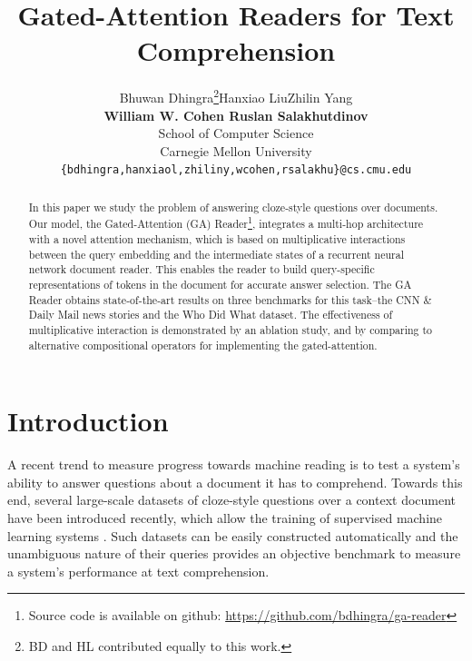 \documentclass[11pt,a4paper]{article}
\title{Gated-Attention Readers for Text Comprehension}
\author{Bhuwan Dhingra\thanks{\enskip BD and HL contributed equally to this work.}\qquad Hanxiao Liu\footnotemark[1]\qquad Zhilin Yang\\ {\bf William W. Cohen \qquad Ruslan Salakhutdinov} \\
School of Computer Science\\
Carnegie Mellon University\\
\texttt{\{bdhingra,hanxiaol,zhiliny,wcohen,rsalakhu\}@cs.cmu.edu}}
\date{}
\begin{document}
\maketitle

\begin{abstract}
In this paper we study the problem of answering cloze-style questions over documents. Our model, the Gated-Attention (GA) Reader\footnote{Source code is available on github: \url{https://github.com/bdhingra/ga-reader}}, integrates a multi-hop architecture with a novel attention mechanism, which is based on multiplicative interactions between the query embedding and the intermediate states of a recurrent neural network document reader. This enables the reader to build query-specific representations of tokens in the document for accurate answer selection. The GA Reader obtains state-of-the-art results on three benchmarks for this task--the CNN \& Daily Mail news stories and the Who Did What dataset.
The effectiveness of multiplicative interaction is demonstrated by an ablation study,
and by comparing to alternative compositional operators for implementing the gated-attention. 
\end{abstract}

\section{Introduction}
A recent trend to measure progress towards machine reading is to test a system's ability to answer questions about a document it has to comprehend. Towards this end, several large-scale datasets of cloze-style questions over a context document have been introduced recently, which allow the training of supervised machine learning systems \citep{hermann2015teaching,hill2015goldilocks,onishi2016did}. Such datasets can be easily constructed automatically and the unambiguous nature of their queries provides an objective benchmark to measure a system's performance at text comprehension. 

\end{document}
